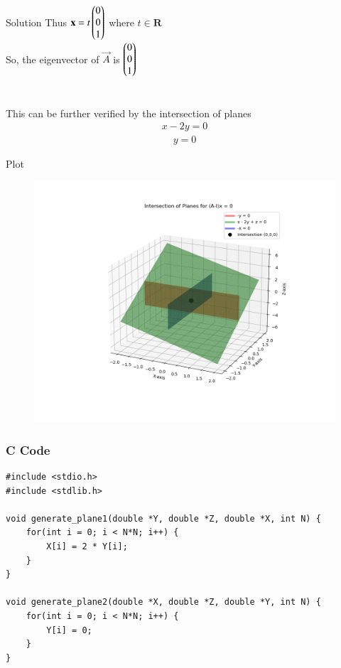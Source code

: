 \documentclass{beamer}
\begin{document}
\begin{frame}{Solution}
Thus $\mathbf{x} = t\begin{pmatrix}0 \\ 0 \\ 1\end{pmatrix}$ where $t \in \mathbf{R}$ \\
So, the eigenvector of $\vec{A}$ is $\begin{pmatrix}0 \\ 0 \\ 1\end{pmatrix}$ \\ \\ \\

This can be further verified by the intersection of planes
\begin{align}
x - 2y = 0
\end{align}
\begin{align}
y = 0
\end{align}
\end{frame}
\begin{frame}{Plot}
    \begin{figure}[H]
        \centering
        \includegraphics[height=0.5\textheight, keepaspectratio]{figs/Figure_1.png}
    \end{figure}
\end{frame}
\begin{frame}[fragile]
    \frametitle{C Code}
    \begin{lstlisting}
#include <stdio.h>
#include <stdlib.h>

void generate_plane1(double *Y, double *Z, double *X, int N) {
    for(int i = 0; i < N*N; i++) {
        X[i] = 2 * Y[i];
    }
}

void generate_plane2(double *X, double *Z, double *Y, int N) {
    for(int i = 0; i < N*N; i++) {
        Y[i] = 0;
    }
}


    \end{lstlisting}
\end{frame}
\end{document}
